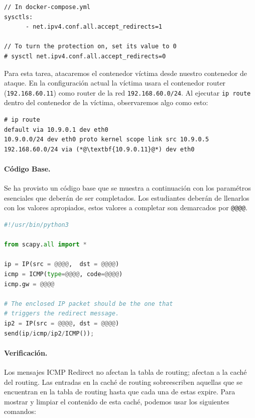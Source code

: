 \begin{lstlisting}
// In docker-compose.yml
sysctls:
      - net.ipv4.conf.all.accept_redirects=1

// To turn the protection on, set its value to 0
# sysctl net.ipv4.conf.all.accept_redirects=0
\end{lstlisting}

Para esta tarea, atacaremos el contenedor víctima desde nuestro contenedor de ataque. En la configuración actual la víctima usara el contenedor router (\texttt{192.168.60.11}) como router de la red \texttt{192.168.60.0/24}. Al ejecutar \texttt{ip route} dentro del contenedor de la víctima, observaremos algo como esto:

\begin{lstlisting}
# ip route
default via 10.9.0.1 dev eth0 
10.9.0.0/24 dev eth0 proto kernel scope link src 10.9.0.5 
192.168.60.0/24 via (*@\textbf{10.9.0.11}@*) dev eth0
\end{lstlisting}
 

\paragraph{Código Base.} Se ha provisto un código base que se muestra a continuación con los paramétros esenciales que deberán de ser completados. Los estudiantes deberán de llenarlos con los valores apropiados, estos valores a completar son demarcados por \texttt{@@@@}. 


\begin{lstlisting}[language=python]
#!/usr/bin/python3

from scapy.all import *

ip = IP(src = @@@@,  dst = @@@@)
icmp = ICMP(type=@@@@, code=@@@@)
icmp.gw = @@@@

# The enclosed IP packet should be the one that 
# triggers the redirect message. 
ip2 = IP(src = @@@@, dst = @@@@)
send(ip/icmp/ip2/ICMP());
\end{lstlisting}
 

\paragraph{Verificación.}
Los mensajes ICMP Redirect no afectan la tabla de routing; afectan a la caché del routing. Las entradas en la caché de routing sobreescriben aquellas que se encuentran en la tabla de routing hasta que cada una de estas expire. Para mostrar y limpiar el contenido de esta caché, podemos usar los siguientes comandos:

